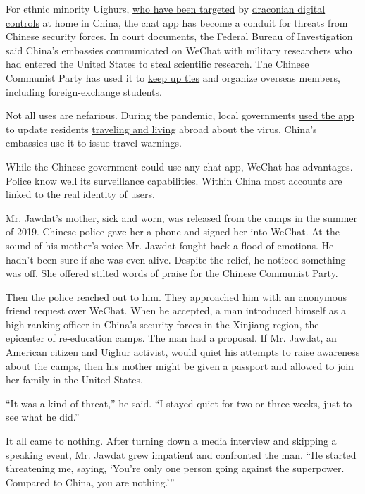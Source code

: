 For ethnic minority Uighurs,
\href{https://www.nytimes3xbfgragh.onion/interactive/2019/11/16/world/asia/china-xinjiang-documents.html}{who
have been targeted} by
\href{https://www.nytimes3xbfgragh.onion/2019/05/22/world/asia/china-surveillance-xinjiang.html}{draconian
digital controls} at home in China, the chat app has become a conduit
for threats from Chinese security forces. In court documents, the
Federal Bureau of Investigation said China's embassies communicated on
WeChat with military researchers who had entered the United States to
steal scientific research. The Chinese Communist Party has used it to
\href{http://news.upc.edu.cn/info/1436/56987.htm}{keep up ties} and
organize overseas members, including
\href{http://zhibu.univs.cn/front/article/show/1/dfc97ce2d56d11e79b5e5254004dfc45}{foreign-exchange
students}.

Not all uses are nefarious. During the pandemic, local governments
\href{http://chuxin.people.cn/n1/2020/0401/c428144-31657155.html}{used
the app} to update residents
\href{http://www.zgqt.zj.cn/6904967.html}{traveling and living} abroad
about the virus. China's embassies use it to issue travel warnings.

While the Chinese government could use any chat app, WeChat has
advantages. Police know well its surveillance capabilities. Within China
most accounts are linked to the real identity of users.

Mr. Jawdat's mother, sick and worn, was released from the camps in the
summer of 2019. Chinese police gave her a phone and signed her into
WeChat. At the sound of his mother's voice Mr. Jawdat fought back a
flood of emotions. He hadn't been sure if she was even alive. Despite
the relief, he noticed something was off. She offered stilted words of
praise for the Chinese Communist Party.

Then the police reached out to him. They approached him with an
anonymous friend request over WeChat. When he accepted, a man introduced
himself as a high-ranking officer in China's security forces in the
Xinjiang region, the epicenter of re-education camps. The man had a
proposal. If Mr. Jawdat, an American citizen and Uighur activist, would
quiet his attempts to raise awareness about the camps, then his mother
might be given a passport and allowed to join her family in the United
States.

``It was a kind of threat,'' he said. ``I stayed quiet for two or three
weeks, just to see what he did.''

It all came to nothing. After turning down a media interview and
skipping a speaking event, Mr. Jawdat grew impatient and confronted the
man. ``He started threatening me, saying, `You're only one person going
against the superpower. Compared to China, you are nothing.'''

